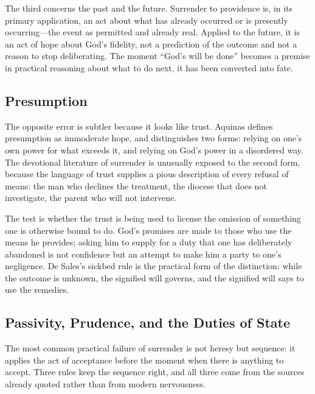 The third concerns the past and the future. Surrender to providence is, in its primary application, an act about what has already occurred or is presently occurring---the event as permitted and already real. Applied to the future, it is an act of hope about God's fidelity, not a prediction of the outcome and not a reason to stop deliberating. The moment ``God's will be done'' becomes a premise in practical reasoning about what to do next, it has been converted into fate.

\subsection{Presumption}

The opposite error is subtler because it looks like trust. Aquinas defines presumption as immoderate hope, and distinguishes two forms: relying on one's own power for what exceeds it, and relying on God's power in a disordered way. The devotional literature of surrender is unusually exposed to the second form, because the language of trust supplies a pious description of every refusal of means: the man who declines the treatment, the diocese that does not investigate, the parent who will not intervene.

The test is whether the trust is being used to license the omission of something one is otherwise bound to do. God's promises are made to those who use the means he provides; asking him to supply for a duty that one has deliberately abandoned is not confidence but an attempt to make him a party to one's negligence. De Sales's sickbed rule is the practical form of the distinction: while the outcome is unknown, the signified will governs, and the signified will says to use the remedies.

\subsection{Passivity, Prudence, and the Duties of State}

The most common practical failure of surrender is not heresy but sequence: it applies the act of acceptance before the moment when there is anything to accept. Three rules keep the sequence right, and all three come from the sources already quoted rather than from modern nervousness.

